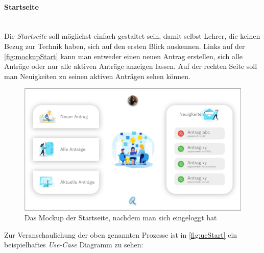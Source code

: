 \paragraph{Startseite}
~\\
Die \textit{Startseite} soll möglichst einfach gestaltet sein, damit selbst Lehrer, die keinen Bezug zur Technik haben, sich auf den ersten Blick auskennen. Links auf der \autoref{fig:mockupStart} kann man entweder einen neuen Antrag erstellen, sich alle Anträge oder nur alle aktiven Anträge anzeigen lassen. Auf der rechten Seite soll man Neuigkeiten zu seinen aktiven Anträgen sehen können.
\begin{figure}[H]
	\centering
	\includegraphics[width=1\linewidth]{images/ldehner_konzept/Mockup-Startseite-eingeloggt}
	\caption[Mockup Startseite]{Das Mockup der Startseite, nachdem man sich eingeloggt hat}
	\label{fig:mockupStart}
\end{figure}
Zur Veranschaulichung der oben genannten Prozesse ist in \autoref{fig:ucStart} ein beispielhaftes \textit{Use-Case} Diagramm zu sehen: 
